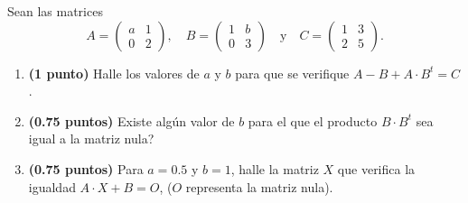 
Sean las matrices
\[
A=\begin{pmatrix}a&1\\0&2\end{pmatrix},\quad B=\begin{pmatrix}1&b\\0&3\end{pmatrix}\quad\text{y}\quad C=\begin{pmatrix}1&3\\2&5\end{pmatrix}.
\]
\begin{enumerate}[label=\alph*)]
\item \textbf{(1 punto)} Halle los valores de $a$ y $b$ para que se verifique $A-B+A\cdot B^t=C$.
\item \textbf{(0.75 puntos)} \textquestiondown{}Existe algún valor de $b$ para el que el producto $B\cdot B^t$ sea igual a la matriz nula?
\item \textbf{(0.75 puntos)} Para $a=0.5$ y $b=1$, halle la matriz $X$ que verifica la igualdad $A\cdot X+B=O$, ($O$ representa la matriz nula).
\end{enumerate}
